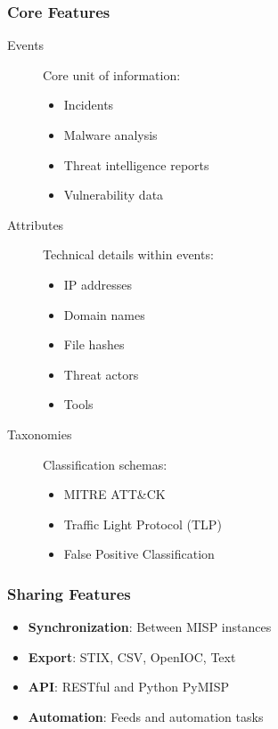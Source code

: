 \subsubsection{Core Features}
\begin{description}
    \item[Events] Core unit of information:
    \begin{itemize}
        \item Incidents
        \item Malware analysis
        \item Threat intelligence reports
        \item Vulnerability data
    \end{itemize}
    
    \item[Attributes] Technical details within events:
    \begin{itemize}
        \item IP addresses
        \item Domain names
        \item File hashes
        \item Threat actors
        \item Tools
    \end{itemize}
    
    \item[Taxonomies] Classification schemas:
    \begin{itemize}
        \item MITRE ATT\&CK
        \item Traffic Light Protocol (TLP)
        \item False Positive Classification
    \end{itemize}
\end{description}

\subsubsection{Sharing Features}
\begin{itemize}
    \item \textbf{Synchronization}: Between MISP instances
    \item \textbf{Export}: STIX, CSV, OpenIOC, Text
    \item \textbf{API}: RESTful and Python PyMISP
    \item \textbf{Automation}: Feeds and automation tasks
\end{itemize}

